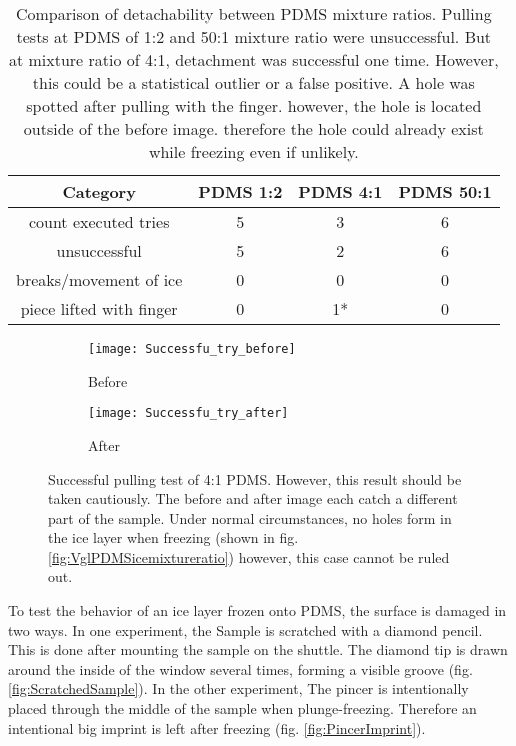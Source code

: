 \begin{table}
	\centering
	\begin{tabular}{|c|c|c|c|}
		\hline
		Category & PDMS 1:2 & PDMS 4:1 & PDMS 50:1 \\
		\hline
		\hline
		count executed tries & 5 & 3 & 6\\
		\hline
		unsuccessful & 5 & 2 & 6\\
		\hline
		breaks/movement of ice & 0 & 0 & 0\\
		\hline
		piece lifted with finger & 0 & 1* & 0\\
		\hline		
	\end{tabular}
	\caption{Comparison of detachability between PDMS mixture ratios. Pulling tests at PDMS of 1:2 and 50:1 mixture ratio were unsuccessful. But at mixture ratio of 4:1, detachment was successful one time. However, this could be a statistical outlier or a false positive. A hole was spotted after pulling with the finger. however, the hole is located outside of the before image. therefore the hole could already exist while freezing even if unlikely.}
	\label{table:AttemptsPDMS}
\end{table}

\begin{figure}[hbt!]
	\centering
	\begin{subfigure}[]{0.45\textwidth}
		\centering
		\texttt{[image: Successfu\_try\_before]}
		\caption{Before}
	\end{subfigure}
	\begin{subfigure}[]{0.45\textwidth}
		\centering
		\texttt{[image: Successfu\_try\_after]}
		\caption{After}
	\end{subfigure}
	\caption{Successful pulling test of 4:1 PDMS. However, this result should be taken cautiously. The before and after image each catch a different part of the sample. Under normal circumstances, no holes form in the ice layer when freezing (shown in fig. \ref{fig:VglPDMSicemixtureratio}) however, this case cannot be ruled out.}
	\label{fig:SuccessfulDetachment}
\end{figure}

To test the behavior of an ice layer frozen onto PDMS, the surface is damaged in two ways. In one experiment, the Sample is scratched with a diamond pencil. This is done after mounting the sample on the shuttle. The diamond tip is drawn around the inside of the window several times, forming a visible groove (fig. \ref{fig:ScratchedSample}). In the other experiment, The pincer is intentionally placed through the middle of the sample when plunge-freezing. Therefore an intentional big imprint is left after freezing (fig. \ref{fig:PincerImprint}).

